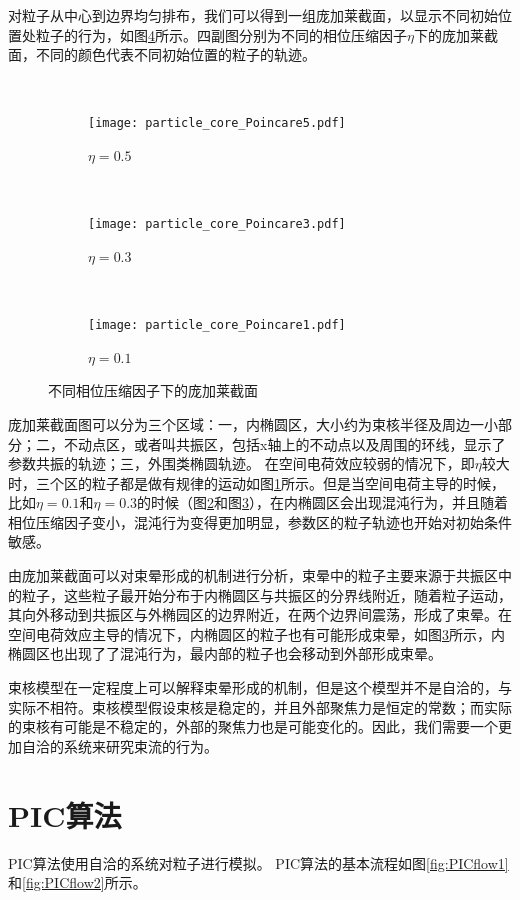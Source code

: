 对粒子从中心到边界均匀排布，我们可以得到一组庞加莱截面，以显示不同初始位置处粒子的行为，如图\ref{fig:particle_core_Poincare}所示。四副图分别为不同的相位压缩因子$\eta$下的庞加莱截面，不同的颜色代表不同初始位置的粒子的轨迹。
\begin{figure}[!htbp]
  \centering
  ~%
  \begin{subfigure}[b]{0.6\textwidth}
    \texttt{[image: particle\_core\_Poincare5.pdf]}
    \caption{$\eta = 0.5$}
    \label{fig:particle_core_Poincare5}
  \end{subfigure}
  ~
  \begin{subfigure}[b]{0.6\textwidth}
    \texttt{[image: particle\_core\_Poincare3.pdf]}
    \caption{$\eta = 0.3$}
    \label{fig:particle_core_Poincare3}
  \end{subfigure}%
  ~
  \begin{subfigure}[b]{0.6\textwidth}
    \texttt{[image: particle\_core\_Poincare1.pdf]}
    \caption{$\eta = 0.1$}
    \label{fig:particle_core_Poincare1}
  \end{subfigure}%
  \caption{不同相位压缩因子下的庞加莱截面}
  \label{fig:particle_core_Poincare}
\end{figure}

庞加莱截面图可以分为三个区域：一，内椭圆区，大小约为束核半径及周边一小部分；二，不动点区，或者叫共振区，包括x轴上的不动点以及周围的环线，显示了参数共振的轨迹；三，外围类椭圆轨迹。
在空间电荷效应较弱的情况下，即$\eta$较大时，三个区的粒子都是做有规律的运动如图\ref{fig:particle_core_Poincare5}所示。但是当空间电荷主导的时候，比如$\eta=0.1$和$\eta=0.3$的时候（图\ref{fig:particle_core_Poincare3}和图\ref{fig:particle_core_Poincare1}），在内椭圆区会出现混沌行为，并且随着相位压缩因子变小，混沌行为变得更加明显，参数区的粒子轨迹也开始对初始条件敏感。

由庞加莱截面可以对束晕形成的机制进行分析，束晕中的粒子主要来源于共振区中的粒子，这些粒子最开始分布于内椭圆区与共振区的分界线附近，随着粒子运动，其向外移动到共振区与外椭园区的边界附近，在两个边界间震荡，形成了束晕。在空间电荷效应主导的情况下，内椭圆区的粒子也有可能形成束晕，如图\ref{fig:particle_core_Poincare1}所示，内椭圆区也出现了了混沌行为，最内部的粒子也会移动到外部形成束晕。

束核模型在一定程度上可以解释束晕形成的机制，但是这个模型并不是自洽的，与实际不相符。束核模型假设束核是稳定的，并且外部聚焦力是恒定的常数；而实际的束核有可能是不稳定的，外部的聚焦力也是可能变化的。因此，我们需要一个更加自洽的系统来研究束流的行为。

\section{PIC算法}
\label{section:PIC_algorithm}
PIC算法使用自洽的系统对粒子进行模拟。
PIC算法的基本流程如图\ref{fig:PICflow1}和\ref{fig:PICflow2}所示。


